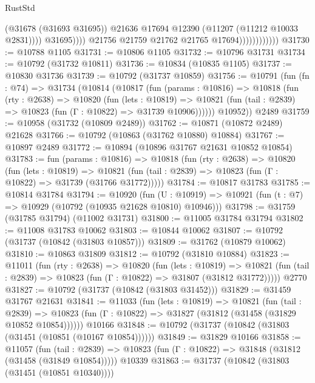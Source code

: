 \begin{lexlean}{RustStd}
\begin{coremodule}
                                        (@31678 (@31693 @31695))
                                        @21636
                                        @17694
                                        @12390
                                        (@11207 (@11212 @10033 @2831))))
                                    @31695))))
                            @21756
                            @21759
                            @21762
                            @21765
                            @17694))))))))))))
@31730 := @10788 @1105
@31731 := @10806 @1105
@31732 := @10796 @31731
@31734 := @10792 (@31732 @10811)
@31736 := @10834 (@10835 @1105)
@31737 := @10830 @31736
@31739 := @10792 (@31737 @10859)
@31756 := @10791
    (fun (fn : @74) =>
    @31734
      (@10814
        (@10817
          (fun (params : @10816) =>
          @10818
            (fun (rty : @2638) =>
            @10820
              (fun (lets : @10819) =>
              @10821 (fun (tail : @2839) => @10823 (fun (Γ : @10822) => @31739 @10906))))))
        @10952))
    @2489
@31759 := @10958 (@31732 (@10809 @2489))
@31762 := @10871 (@10872 @2489) @21628
@31766 := @10792 (@10863 (@31762 @10880) @10884)
@31767 := @10897 @2489
@31772 := @10894 (@10896 @31767 @21631 @10852 @10854)
@31783 := fun (params : @10816) =>
  @10818
    (fun (rty : @2638) =>
    @10820
      (fun (lets : @10819) =>
      @10821 (fun (tail : @2839) => @10823 (fun (Γ : @10822) => @31739 (@31766 @31772)))))
@31784 := @10817 @31783
@31785 := @10814 @31784
@31794 := @10920
    (fun (U : @10919) => @10921 (fun (t : @7) => @10929 (@10792 (@10935 @21628 @10810) @10946)))
@31798 := @31759 (@31785 @31794) (@11002 @31731)
@31800 := @11005 @31784 @31794
@31802 := @11008 @31783 @10062
@31803 := @10844 @10062
@31807 := @10792 (@31737 (@10842 (@31803 @10857)))
@31809 := @31762 (@10879 @10062)
@31810 := @10863 @31809
@31812 := @10792 (@31810 @10884)
@31823 := @11011
    (fun (rty : @2638) =>
    @10820
      (fun (lets : @10819) =>
      @10821 (fun (tail : @2839) => @10823 (fun (Γ : @10822) => @31807 (@31812 @31772)))))
    @2770
@31827 := @10792 (@31737 (@10842 (@31803 @31452)))
@31829 := @31459 @31767 @21631
@31841 := @11033
    (fun (lets : @10819) =>
    @10821
      (fun (tail : @2839) =>
      @10823 (fun (Γ : @10822) => @31827 (@31812 (@31458 (@31829 @10852 @10854))))))
    @10166
@31848 := @10792 (@31737 (@10842 (@31803 (@31451 (@10851 (@10167 @10854))))))
@31849 := @31829 @10166
@31858 := @11057
    (fun (tail : @2839) => @10823 (fun (Γ : @10822) => @31848 (@31812 (@31458 (@31849 @10854)))))
    @10339
@31863 := @31737 (@10842 (@31803 (@31451 (@10851 @10340))))

\end{coremodule}
\end{lexlean}
